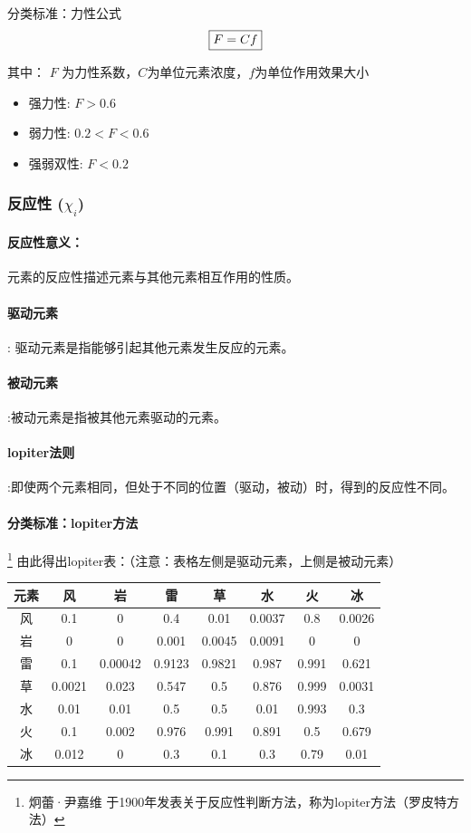 \documentclass[12pt,a4paper]{article}%
\begin{document}
	分类标准：力性公式
	\begin{equation}
		\boxed{ F=Cf  } \notag
	\end{equation}

		其中：
		$F$ 为力性系数，$C$为单位元素浓度，$f$为单位作用效果大小
	\begin{itemize}
		\item 强力性:  $F>0.6$ 
		\item 弱力性:  $0.2<F<0.6$ 
		\item 强弱双性:  $F<0.2$ 
	\end{itemize}

	\subsubsection{反应性 ($\chi_i $)}
	\paragraph{反应性意义：}元素的反应性描述元素与其他元素相互作用的性质。
	\paragraph{驱动元素}: 驱动元素是指能够引起其他元素发生反应的元素。
	\paragraph{被动元素}:被动元素是指被其他元素驱动的元素。
	\paragraph{lopiter法则}:即使两个元素相同，但处于不同的位置（驱动，被动）时，得到的反应性不同。
	\paragraph{分类标准：lopiter方法}\footnote[1]{炯蕾·尹嘉维 于1900年发表关于反应性判断方法，称为lopiter方法（罗皮特方法）}
	由此得出lopiter表：（注意：表格左侧是驱动元素，上侧是被动元素）

	\begin{tabular}{|c|c|c|c|c|c|c|c|}
		\hline
		元素&风&岩&雷&草&水&火&冰\\
		\hline
		风&0.1&0&0.4&0.01&0.0037&0.8&0.0026\\
		\hline
		岩&0&0&0.001&0.0045&0.0091&0&0\\
		\hline
		雷&0.1&0.00042&0.9123&0.9821&0.987&0.991&0.621\\
		\hline
		草&0.0021&0.023&0.547&0.5&0.876&0.999&0.0031\\
		\hline
		水&0.01&0.01&0.5&0.5&0.01&0.993&0.3\\
		\hline
		火&0.1&0.002&0.976&0.991&0.891&0.5&0.679\\
		\hline
		冰&0.012&0&0.3&0.1&0.3&0.79&0.01\\
		\hline
	\end{tabular}
\end{document}
